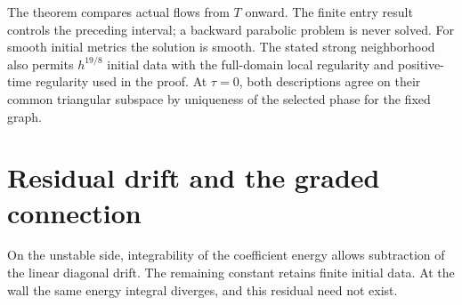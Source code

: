 \documentclass[11pt]{amsart}
\theoremstyle{definition}
\theoremstyle{remark}
\begin{document}
The theorem compares actual flows from $T$ onward. The finite
entry result controls the preceding interval; a backward
parabolic problem is never solved. For smooth initial metrics
the solution is smooth. The stated strong neighborhood also
permits $h^{19/8}$ initial data with the full-domain local
regularity and positive-time regularity used in the proof.
At $\tau=0$, both descriptions agree on their common triangular
subspace by uniqueness of the selected phase for the fixed graph.

\section{Residual drift and the graded connection}\label{sec:residual}

On the unstable side, integrability of the coefficient energy
allows subtraction of the linear diagonal drift. The remaining
constant retains finite initial data. At the wall the same
energy integral diverges, and this residual need not exist.
\end{document}
